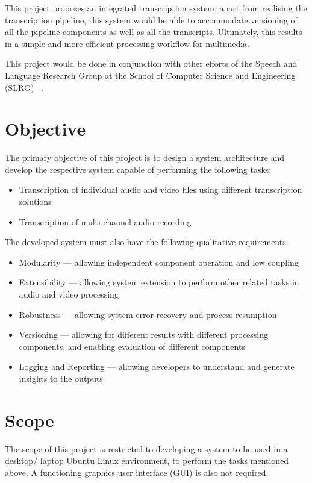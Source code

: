 This project proposes an integrated transcription system; apart from realising
the transcription pipeline, this system would be able to accommodate versioning
of all the pipeline components as well as all the transcripts. Ultimately, this
results in a simple and more efficient processing workflow for multimedia.

This project would be done in conjunction with other efforts of the Speech and
Language Research Group at the School of Computer Science and Engineering (SLRG)
~\cite{slrg}.

\section{Objective}

The primary objective of this project is to design a system architecture and
develop the respective system capable of performing the following tasks:

\begin{itemize}
    \item Transcription of individual audio and video files using different
    transcription solutions
    \item Transcription of multi-channel audio recording
\end{itemize}

The developed system must also have the following qualitative requirements:

\begin{itemize}
    \item Modularity --- allowing independent component operation and low coupling
    \item Extensibility --- allowing system extension to perform other related
    tasks in audio and video processing
    \item Robustness --- allowing system error recovery and process resumption
    \item Versioning --- allowing for different results with different processing
    components, and enabling evaluation of different components
    \item Logging and Reporting --- allowing developers to understand and generate
    insights to the outputs
\end{itemize}

\section{Scope}

The scope of this project is restricted to developing a system to be used in a
desktop/ laptop Ubuntu Linux environment, to perform the tasks mentioned above. A
functioning graphics user interface (GUI) is also not required.

